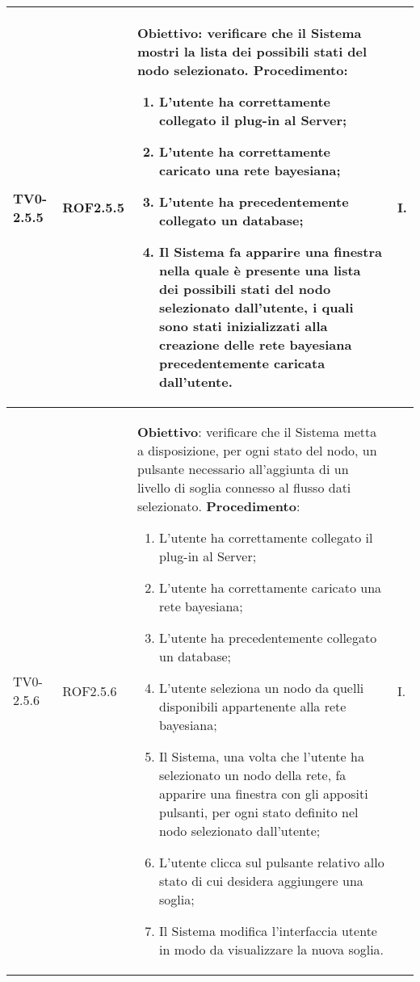 \begin{longtable}{|C{.15\textwidth}|C{.13\textwidth}|m{.52\textwidth}|C{.08\textwidth}|}
TV0-2.5.5 & ROF2.5.5 &
	\textbf{Obiettivo}: verificare che il Sistema mostri la lista dei possibili stati del nodo selezionato. \newline
	\textbf{Procedimento}:
	\begin{enumerate}
		\item L'utente ha correttamente collegato il plug-in al Server;
		\item L'utente ha correttamente caricato una rete bayesiana;
		\item L'utente ha precedentemente collegato un database;
		\item Il Sistema fa apparire una finestra nella quale è presente   una lista dei possibili stati del nodo selezionato dall'utente, i quali sono stati inizializzati alla creazione delle rete bayesiana precedentemente caricata dall'utente.
	\end{enumerate}
	& I. \\
\hline

TV0-2.5.6 & ROF2.5.6 &
	\textbf{Obiettivo}: verificare che il Sistema metta a disposizione, per ogni stato del nodo, un pulsante necessario all'aggiunta di un livello di soglia connesso al flusso dati selezionato. \newline
	\textbf{Procedimento}:
	\begin{enumerate}
		\item L'utente ha correttamente collegato il plug-in al Server;
		\item L'utente ha correttamente caricato una rete bayesiana;
		\item L'utente ha precedentemente collegato un database;
		\item L'utente seleziona un nodo da quelli disponibili appartenente alla rete bayesiana;
		\item Il Sistema, una volta che l'utente ha selezionato un nodo della rete, fa apparire una finestra con gli appositi pulsanti, per ogni stato definito nel nodo selezionato dall'utente;
		\item L'utente clicca sul pulsante relativo allo stato di cui desidera aggiungere una soglia;
		\item Il Sistema modifica l'interfaccia utente in modo da visualizzare la nuova soglia.
	\end{enumerate}
	& I. \\
\hline


\end{longtable}
